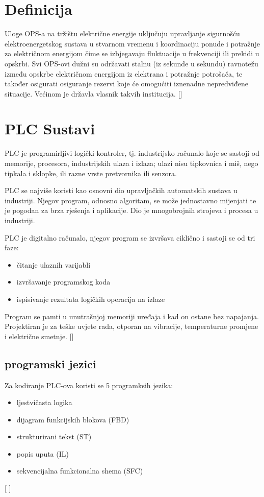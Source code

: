 \documentclass[times, utf8, zavrsni]{fer}
\begin{document}
\section{Definicija}
Uloge OPS-a na tržištu električne energije uključuju upravljanje sigurnošću elektroenergetskog sustava u stvarnom vremenu i koordinaciju ponude i potražnje za električnom energijom čime se izbjegavaju fluktuacije u frekvenciji ili prekidi u opskrbi. 
Svi OPS-ovi dužni su održavati stalnu (iz sekunde u sekundu) ravnotežu između opskrbe električnom energijom iz elektrana i potražnje potrošača, te također osigurati osiguranje rezervi koje će omogućiti iznenadne nepredviđene situacije. Većinom je državla vlasnik takvih institucija. [\cite{tso}] 

\section{PLC Sustavi}

PLC je programirljivi logički kontroler, tj. industrijsko računalo koje se sastoji od memorije, procesora, industrijskih ulaza i izlaza; ulazi nisu tipkovnica i miš, nego tipkala i sklopke, ili razne vrste pretvornika ili senzora.

PLC se najviše koristi kao osnovni dio upravljačkih automatskih sustava u industriji. Njegov program, odnosno algoritam, se može jednostavno mijenjati te je pogodan za brza rješenja i aplikacije. Dio je mnogobrojnih strojeva i procesa u industriji.

PLC je digitalno računalo, njegov program se izvršava ciklično i sastoji se od tri faze:
\begin{itemize}
\item{čitanje ulaznih varijabli}
\item{izvršavanje programskog koda}
\item{ispisivanje rezultata logičkih operacija na izlaze}
\end{itemize}

Program se pamti u unutrašnjoj memoriji uređaja i kad on ostane bez napajanja. Projektiran je za teške uvjete rada, otporan na vibracije, temperaturne promjene i električne smetnje. [\cite{plc2}]
\subsection{programski jezici}
Za kodiranje PLC-ova koristi se 5 programksih jezika:
\begin{itemize}
\item{ljestvičasta logika}
\item{dijagram funkcijskih blokova (FBD)}
\item{strukturirani tekst (ST)}
\item{popis uputa (IL)}
\item{sekvencijalna funkcionalna shema (SFC)}
\end{itemize} [ \cite{plc}]
\end{document}
